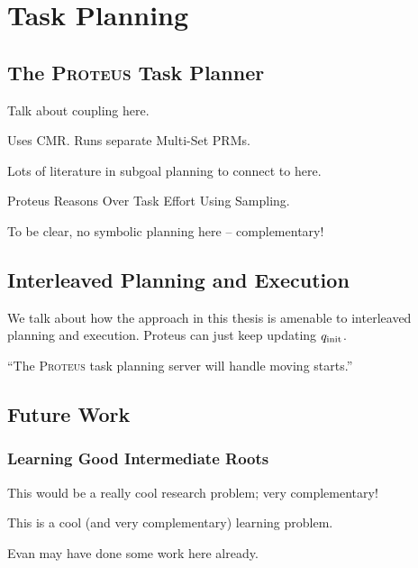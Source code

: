 \chapter{Task Planning}
\label{chap:task-planning}

\section{The \textsc{Proteus} Task Planner}

Talk about coupling here.

Uses CMR.
Runs separate Multi-Set PRMs.

Lots of literature in subgoal planning to connect to here.

Proteus Reasons Over Task Effort Using Sampling.

To be clear, no symbolic planning here --
complementary!

\section{Interleaved Planning and Execution}
\label{sec:interleaved}

We talk about how the approach in this thesis is
amenable to interleaved planning and execution.
Proteus can just keep updating $q_{\mbox{\scriptsize init}}$.

``The \textsc{Proteus} task planning server
will handle moving starts.''

\section{Future Work}

\subsection{Learning Good Intermediate Roots}
\label{subsec:learning-good-intermediate-roots}

This would be a really cool research problem;
very complementary!

This is a cool (and very complementary) learning problem.

Evan may have done some work here already.
